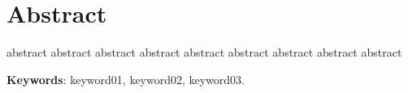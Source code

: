 \chapter*{\centering Abstract}
abstract abstract abstract
abstract abstract abstract
abstract abstract abstract

\vspace{.5cm}
\textbf{Keywords}:
keyword01, keyword02, keyword03.

